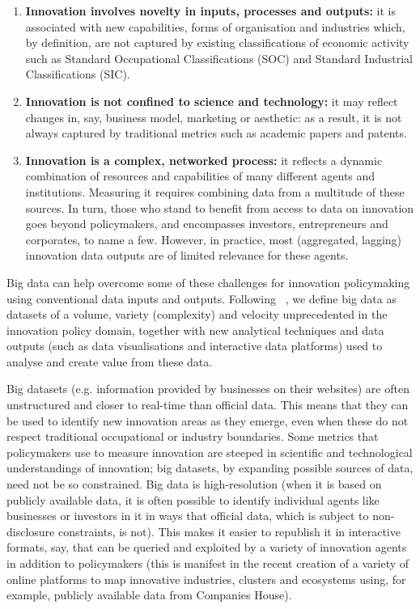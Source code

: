 \documentclass[a4paper,11pt]{article}
\begin{document}
\begin{enumerate}
\item {\textbf{Innovation involves novelty in inputs, processes and outputs:}} it
  is associated with new capabilities, forms of organisation and
  industries which, by definition, are not captured by existing
  classifications of economic activity such as Standard Occupational
  Classifications (SOC) and Standard Industrial Classifications
  (SIC).
\item {\textbf{Innovation is not confined to science and technology:}} it may
  reflect changes in, say, business model, marketing or aesthetic: as
  a result, it is not always captured by traditional metrics such as
  academic papers and patents. 
\item {\textbf{Innovation is a complex, networked process:}} it reflects a
  dynamic combination of resources and capabilities of many different
  agents and institutions. Measuring it requires combining data from a
  multitude of these sources. In turn, those who stand to benefit from
  access to data on innovation goes beyond policymakers, and
  encompasses investors, entrepreneurs and corporates, to name a
  few. However, in practice, most (aggregated, lagging) innovation
  data outputs are of limited relevance for these agents.
\end{enumerate}

Big data can help overcome some of these challenges for innovation
policymaking using conventional data inputs and outputs. Following
~\citet{schroeder+cowls:2014}, we define big data as datasets of a
volume, variety (complexity) and velocity unprecedented in the
innovation policy domain, together with new analytical techniques and
data outputs (such as data visualisations and interactive data
platforms) used to analyse and create value from these data.

Big datasets (e.g. information provided by businesses on their
websites) are often unstructured and closer to real-time than official
data. This means that they can be used to identify new innovation
areas as they emerge, even when these do not respect traditional
occupational or industry boundaries. Some metrics that policymakers
use to measure innovation are steeped in scientific and technological
understandings of innovation; big datasets, by expanding possible
sources of data, need not be so constrained. Big data is
high-resolution (when it is based on publicly available data, it is
often possible to identify individual agents like businesses or
investors in it in ways that official data, which is subject to
non-disclosure constraints, is not). This makes it easier to republish
it in interactive formats, say, that can be queried and exploited by a
variety of innovation agents in addition to policymakers (this is
manifest in the recent creation of a variety of online platforms to
map innovative industries, clusters and ecosystems using, for example,
publicly available data from Companies House).
\end{document}
